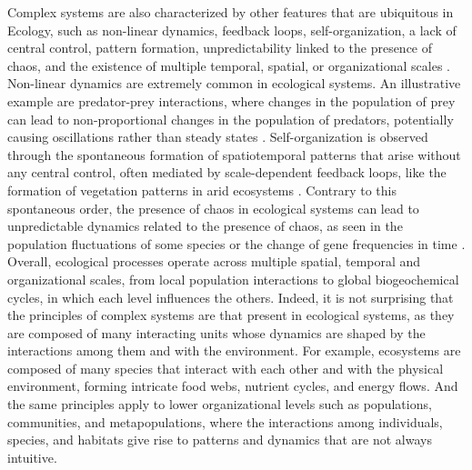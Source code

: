 Complex systems are also characterized by other features that are ubiquitous in
Ecology, such as non-linear dynamics, feedback loops, self-organization, a lack
of central control, pattern formation, unpredictability linked to the presence
of chaos, and the existence of multiple temporal, spatial, or organizational
scales \cite{Bianconi_2023}. Non-linear dynamics are extremely common in
ecological systems. An illustrative example are predator-prey interactions,
where changes in the population of prey can lead to non-proportional changes in
the population of predators, potentially causing oscillations rather than
steady states \cite{Lotka1925}. Self-organization is observed through the
spontaneous formation of spatiotemporal patterns that arise without any central
control, often mediated by scale-dependent feedback loops, like the formation
of vegetation patterns in arid ecosystems \cite{Rietkerk2008}. Contrary to
this spontaneous order, the presence of chaos in ecological systems can lead to
unpredictable dynamics related to the presence of chaos, as seen in the
population fluctuations of some species or the change of gene frequencies in
time \cite{May1974,May1976}. Overall, ecological processes operate across
multiple spatial, temporal and organizational scales, from local population
interactions to global biogeochemical cycles, in which each level influences
the others. Indeed, it is not surprising that the principles of complex systems
are that present in ecological systems, as they are composed of many
interacting units whose dynamics are shaped by the interactions among them and
with the environment. For example, ecosystems are composed of many species that
interact with each other and with the physical environment, forming intricate
food webs, nutrient cycles, and energy flows. And the same principles apply to
lower organizational levels such as populations, communities, and
metapopulations, where the interactions among individuals, species, and
habitats give rise to patterns and dynamics that are not always intuitive.

